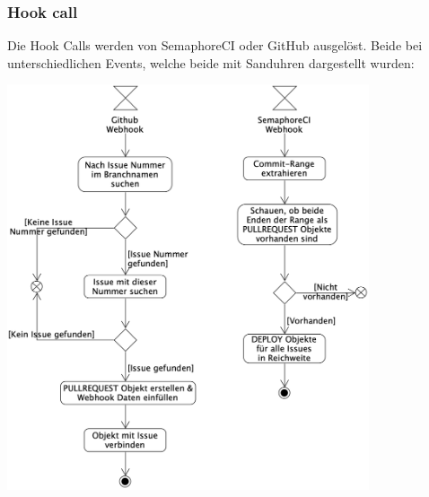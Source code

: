 \subsubsection{Hook call}
Die Hook Calls werden von SemaphoreCI oder GitHub ausgelöst. Beide bei unterschiedlichen Events, welche beide mit Sanduhren
dargestellt wurden:
\begin{center}
  \includegraphics[width=0.8\textwidth]{images/activity/webhook.png}
  \label{fig:activity_hook_call}
\end{center}

